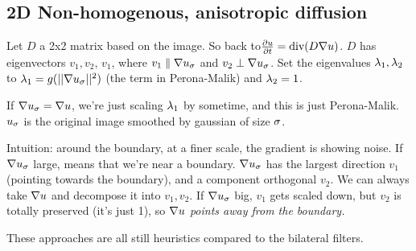 \subsection{2D Non-homogenous, anisotropic diffusion}
\label{sec:2d-non-homogenous}
Let $D$ a 2x2 matrix based on the image. So back to$\frac{\partial
  u}{\partial t} = \text{div}(D\nabla u) $. $D$ has eigenvectors $v_1,
v_2$, $v_1$, where  $v_1 \parallel \nabla u_\sigma$ and $v_2 \perp \nabla
u_\sigma$. Set the eigenvalues $\lambda_1, \lambda_2$ to $\lambda_1 = g(||\nabla u_\sigma
||^2)$ (the term in Perona-Malik) and $\lambda_2 = 1$.

If $\nabla u_\sigma = \nabla u$, we're just scaling $\lambda_1$ by sometime,
and this is just Perona-Malik. $u_\sigma$ is the original image smoothed
by gaussian of size $\sigma$.

Intuition: around the boundary, at a finer scale, the gradient is
showing noise. If $\nabla u_\sigma$ large, means that we're near a
boundary. 
$\nabla u_\sigma$ has the largest direction $v_1$ (pointing towards the boundary), and a component
orthogonal $v_2$. We can always take $\nabla u$ and decompose it
into $v_1, v_2$. If $\nabla u_\sigma$ big, $v_1$ gets scaled down, but
$v_2$ is totally preserved (it's just 1), so \emph{$\nabla u$ points away
from the boundary.} 

These approaches are all still heuristics compared to the bilateral filters.





\pagebreak
\pagebreak
\pagebreak


